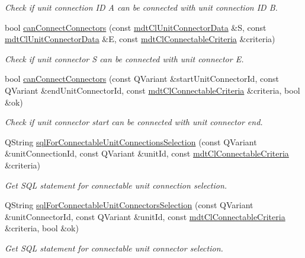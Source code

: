 \begin{DoxyCompactItemize}
\begin{DoxyCompactList}\small\item\em Check if unit connection I\-D A can be connected with unit connection I\-D B. \end{DoxyCompactList}\item 
bool \hyperlink{classmdt_cl_link_ad89a4917ee015c321ec2ecbd5f862296}{can\-Connect\-Connectors} (const \hyperlink{classmdt_cl_unit_connector_data}{mdt\-Cl\-Unit\-Connector\-Data} \&S, const \hyperlink{classmdt_cl_unit_connector_data}{mdt\-Cl\-Unit\-Connector\-Data} \&E, const \hyperlink{structmdt_cl_connectable_criteria}{mdt\-Cl\-Connectable\-Criteria} \&criteria)
\begin{DoxyCompactList}\small\item\em Check if unit connector S can be connected with unit connector E. \end{DoxyCompactList}\item 
bool \hyperlink{classmdt_cl_link_a37c653c5ba394abfe1176a6b77c8d392}{can\-Connect\-Connectors} (const Q\-Variant \&start\-Unit\-Connector\-Id, const Q\-Variant \&end\-Unit\-Connector\-Id, const \hyperlink{structmdt_cl_connectable_criteria}{mdt\-Cl\-Connectable\-Criteria} \&criteria, bool \&ok)
\begin{DoxyCompactList}\small\item\em Check if unit connector start can be connected with unit connector end. \end{DoxyCompactList}\item 
Q\-String \hyperlink{classmdt_cl_link_a9590cee1d9688cde7363bf01c7b7fa6a}{sql\-For\-Connectable\-Unit\-Connections\-Selection} (const Q\-Variant \&unit\-Connection\-Id, const Q\-Variant \&unit\-Id, const \hyperlink{structmdt_cl_connectable_criteria}{mdt\-Cl\-Connectable\-Criteria} \&criteria)
\begin{DoxyCompactList}\small\item\em Get S\-Q\-L statement for connectable unit connection selection. \end{DoxyCompactList}\item 
Q\-String \hyperlink{classmdt_cl_link_accb860a4a6c4b2ad31e2b62f7c2fae7f}{sql\-For\-Connectable\-Unit\-Connectors\-Selection} (const Q\-Variant \&unit\-Connector\-Id, const Q\-Variant \&unit\-Id, const \hyperlink{structmdt_cl_connectable_criteria}{mdt\-Cl\-Connectable\-Criteria} \&criteria, bool \&ok)
\begin{DoxyCompactList}\small\item\em Get S\-Q\-L statement for connectable unit connector selection. \end{DoxyCompactList}\item 

\end{DoxyCompactItemize}
